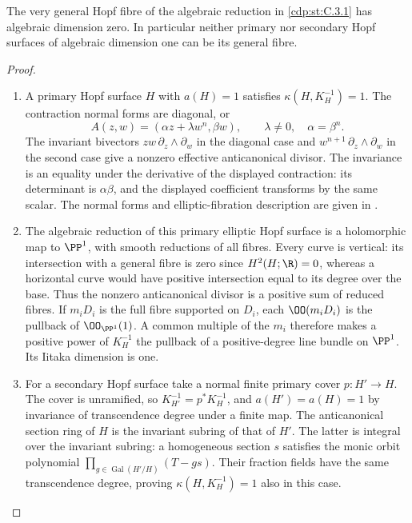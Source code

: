 \begin{proposition}\hypertarget{tag-01FE}{}\label{cdp:st:C.3.8}


The very general Hopf fibre of the algebraic reduction in \ref{cdp:st:C.3.1}
has algebraic dimension zero. In particular neither primary nor
secondary Hopf surfaces of algebraic dimension one can be its
general fibre.
\end{proposition}


\begin{proof}

\begin{enumerate}[label=\arabic*.,leftmargin=*]
\item A primary Hopf surface $H$ with $a(H)=1$ satisfies
$\kappa(H,K_H^{-1})=1$. The contraction
normal forms are diagonal, or
\[
A(z,w)=(\alpha z+\lambda w^n,\beta w),\qquad
\lambda\ne0,\quad \alpha=\beta^n.
\]
The invariant bivectors $zw\,\partial_z\wedge\partial_w$ in the
diagonal case and $w^{n+1}\,\partial_z\wedge\partial_w$ in the
second case give a nonzero effective anticanonical divisor.
The invariance is an equality under the derivative of the
displayed contraction: its determinant is $\alpha\beta$, and
the displayed coefficient transforms by the same scalar.
The normal forms and elliptic-fibration description are given in \cite[Proposition~3.1 and its proof, pp.~6--7]{SS2002}.

\item The algebraic reduction of this primary elliptic Hopf surface is a
holomorphic map to $\PP^1$, with smooth reductions of all fibres.
Every curve is vertical: its intersection with a general fibre
is zero since $H^2(H;\R)=0$, whereas a horizontal curve would
have positive intersection equal to its degree over the base.
Thus the nonzero anticanonical divisor is a positive sum of
reduced fibres. If $m_iD_i$ is the full fibre supported on
$D_i$, each $\OO(m_iD_i)$ is the pullback of $\OO_{\PP^1}(1)$.
A common multiple of the $m_i$ therefore makes a positive power
of $K_H^{-1}$ the pullback of a positive-degree line bundle on
$\PP^1$. Its Iitaka dimension is one.

\item For a secondary Hopf surface take a normal finite primary cover
$p:H'\to H$. The cover is unramified, so
$K_{H'}^{-1}=p^*K_H^{-1}$, and $a(H')=a(H)=1$ by invariance of
transcendence degree under a finite map. The anticanonical
section ring of $H$ is the invariant subring of that of $H'$.
The latter is integral over the invariant subring: a homogeneous
section $s$ satisfies the monic orbit polynomial
$\prod_{g\in\operatorname{Gal}(H'/H)}(T-gs)$. Their fraction
fields have the same transcendence degree, proving
$\kappa(H,K_H^{-1})=1$ also in this case.


\end{enumerate}
\end{proof}
